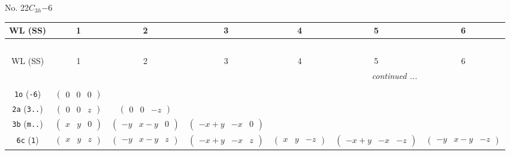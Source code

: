 \documentclass[fleqn,9pt,landscape]{jsarticle}
\begin{document}
\newpage
No. 22\quad$C_{3h}$\quad$-6$\quad[ hexagonal ]
\begin{center}
\renewcommand{\arraystretch}{1.2}
\begin{longtable}{ccccccc}
 \hline \hline
WL (SS) & 1 & 2 & 3 & 4 & 5 & 6 \\ \hline \endfirsthead

\multicolumn{6}{l}{\tablename\ \thetable{}} \\
 \hline \hline
WL (SS) & 1 & 2 & 3 & 4 & 5 & 6 \\ \hline \endhead

 \hline \hline
\multicolumn{6}{r}{\footnotesize\it continued ...} \\ \endfoot

 \hline \hline
\multicolumn{6}{r}{} \\ \endlastfoot

{\tt 1o} ({\tt -6}) & $ \begin{pmatrix} 0 & 0 & 0 \end{pmatrix} $ & $  $ & $  $ & $  $ & $  $ & $  $ \\ \hline
{\tt 2a} ({\tt 3..}) & $ \begin{pmatrix} 0 & 0 & z \end{pmatrix} $ & $ \begin{pmatrix} 0 & 0 & - z \end{pmatrix} $ & $  $ & $  $ & $  $ & $  $ \\ \hline
{\tt 3b} ({\tt m..}) & $ \begin{pmatrix} x & y & 0 \end{pmatrix} $ & $ \begin{pmatrix} - y & x - y & 0 \end{pmatrix} $ & $ \begin{pmatrix} - x + y & - x & 0 \end{pmatrix} $ & $  $ & $  $ & $  $ \\ \hline
{\tt 6c} ({\tt 1}) & $ \begin{pmatrix} x & y & z \end{pmatrix} $ & $ \begin{pmatrix} - y & x - y & z \end{pmatrix} $ & $ \begin{pmatrix} - x + y & - x & z \end{pmatrix} $ & $ \begin{pmatrix} x & y & - z \end{pmatrix} $ & $ \begin{pmatrix} - x + y & - x & - z \end{pmatrix} $ & $ \begin{pmatrix} - y & x - y & - z \end{pmatrix} $ \\
\end{longtable}
\end{center}
\end{document}
